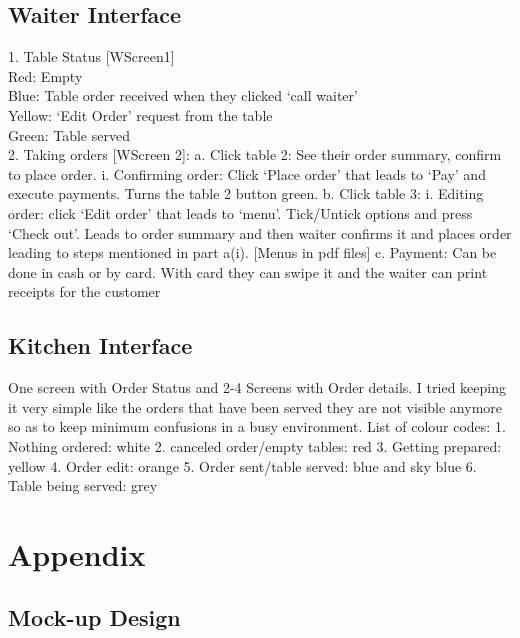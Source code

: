 \documentclass[11pt, a4paper]{report}
\begin{document}
\subsection{Waiter Interface} 
1. Table Status [WScreen1]	\\
Red: Empty\\
Blue: Table order received when they clicked ‘call waiter’\\
Yellow: ‘Edit Order’ request from the table\\
Green: Table served\\
2.	Taking orders [WScreen 2]:
a.	Click table 2: See their order summary, confirm to place order.
i.	Confirming order: Click ‘Place order’ that leads to ‘Pay’ and execute payments. Turns the table 2 button green.
b.	Click table 3:
i.	Editing order: click ‘Edit order’ that leads to ‘menu’. Tick/Untick options and press ‘Check out’. Leads to order summary and then waiter confirms it and places order leading to steps mentioned in part a(i).
[Menus in pdf files]
c.	Payment: Can be done in cash or by card. With card they can swipe it and the waiter can print receipts for the customer \\

\subsection{Kitchen Interface} 
One screen with Order Status and 2-4 Screens with Order details. I tried keeping it very simple like the orders that have been served they are not visible anymore so as to keep minimum confusions in a busy environment.
List of colour codes:
1.	Nothing ordered: white
2.	canceled order/empty tables: red
3.	Getting prepared: yellow
4.	Order edit: orange
5.	Order sent/table served: blue and sky blue
6.	Table being served: grey
\\

\section{Appendix} 
\subsection{Mock-up Design}
\end{document}
